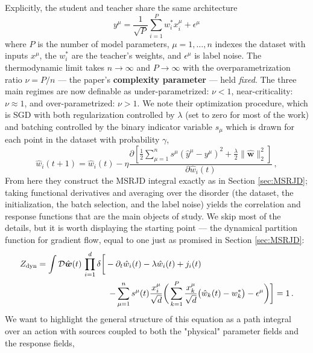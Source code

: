 \documentclass[11pt]{article}
\begin{document}
Explicitly, the student and teacher share the same architecture 
\begin{equation}
    y^\mu=\frac{1}{\sqrt{P}} \sum_{i=1}^P w^*_i x_i^\mu+\epsilon^\mu
\end{equation}
where $P$ is the number of model parameters, $\mu=1, \ldots, n$ indexes the dataset with inputs $x^\mu$, the $w^*_i$ are the teacher's weights, and $\epsilon^\mu$ is label noise.
The thermodynamic limit takes $n \to \infty$ and $P \to \infty$ with the overparametrization ratio $\nu = P/n$ --- the paper's \textbf{complexity parameter} --- held \textit{fixed}. The three main regimes are now definable as under-parametrized: $\nu<1$, near-criticality: $\nu \approx 1$, and over-parametrized: $\nu>1$. We note their optimization procedure, which is SGD with both regularization controlled by $\lambda$ (set to zero for most of the work) and batching controlled by the binary indicator variable $s_\mu$ which is drawn for each point in the dataset with probability $\gamma$,
\begin{equation}
{\hat{w}_i(t+1)=\hat{w}_i(t)-{\eta} \frac{\partial\left[ \frac{1}{2} \sum_{\mu=1}^n s^{\mu}\left(\hat{y}^\mu-y^\mu\right)^2+\frac{\lambda}{2}\|\hat{\boldsymbol{w}}\|_2^2\right]}{\partial \hat{w}_i(t)}}\,,
\label{eq2}
\end{equation}
From here they construct the MSRJD integral exactly as in Section \ref{sec:MSRJD}; taking functional derivatives and averaging over the disorder (the dataset, the initialization, the batch selection, and the label noise) yields the correlation and response functions that are the main objects of study. We skip most of the details, but it is worth displaying the starting point --- the dynamical partition function for gradient flow, equal to one just as promised in Section \ref{sec:MSRJD}:
\begin{equation}
\begin{aligned}
Z_{\mathrm{dyn}} = \int \mathcal{D} \hat{\boldsymbol{w}}(t)\, \prod_{i=1}^d \delta\bigg[-\partial_t{\hat{w}}_i(t) - \lambda \hat{w}_i(t)+j_i(t) \hspace{1.2in} & \\ - \sum_{\mu=1}^n s^\mu(t) \frac{x_i^\mu}{\sqrt{d}} \bigg( \sum_{k=1}^P \frac{x_k^\mu}{\sqrt{d}} \big( \hat{w}_k(t) - w^*_k \big) - \epsilon^\mu \bigg) \bigg] &= 1\,.
\end{aligned}
\label{partition}
\end{equation}
We want to highlight the general structure of this equation as a path integral over an action with sources coupled to both the "physical" parameter fields and the response fields, 
\end{document}
